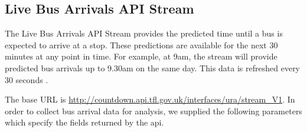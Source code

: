 \subsection{Live Bus Arrivals API Stream}
\par The Live Bus Arrivals API Stream provides the predicted time until a bus is expected to arrive at a stop. These predictions are available for the next 30 minutes at any point in time. For example, at 9am, the stream will provide predicted bus arrivals up to 9.30am on the same day. This data is refreshed every 30 seconds \cite{live_bus_api_documentation}.

\par The base URL is \url{http://countdown.api.tfl.gov.uk/interfaces/ura/stream_V1}. In order to collect bus arrival data for analysis, we supplied the following parameters which specify the fields returned by the \acrshort{api}.


